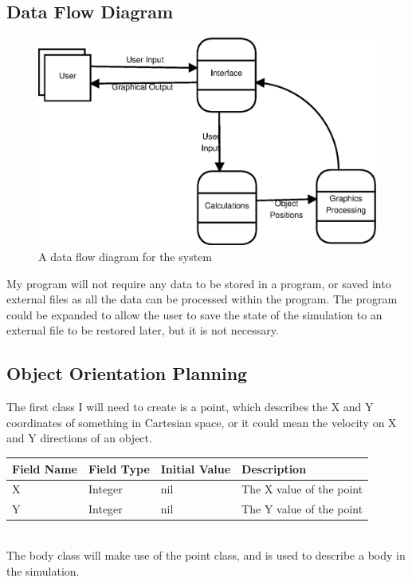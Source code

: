 \subsection{Data Flow Diagram}
\begin{figure}[h]
	\includegraphics[width=\textwidth]{./img/data-flow-diagram2.eps}
	\caption{A data flow diagram for the system}
	\label{fig:dfd}
\end{figure}
My program will not require any data to be stored in a program, or saved into
external files as all the data can be processed within the program. The program
could be expanded to allow the user to save the state of the simulation to an
external file to be restored later, but it is not necessary.

\subsection{Object Orientation Planning}
The first class I will need to create is a point, which describes the X and Y
coordinates of something in Cartesian space, or it could mean the velocity on X
and Y directions of an object. \\

\begin{tabularx}{\linewidth}{lllX}
	Field Name & Field Type & Initial Value & Description \\ \hline
	X & Integer & nil & The X value of the point \\
	Y & Integer & nil & The Y value of the point \\
\end{tabularx} \\

The body class will make use of the point class, and is used to describe a body
in the simulation. \\

